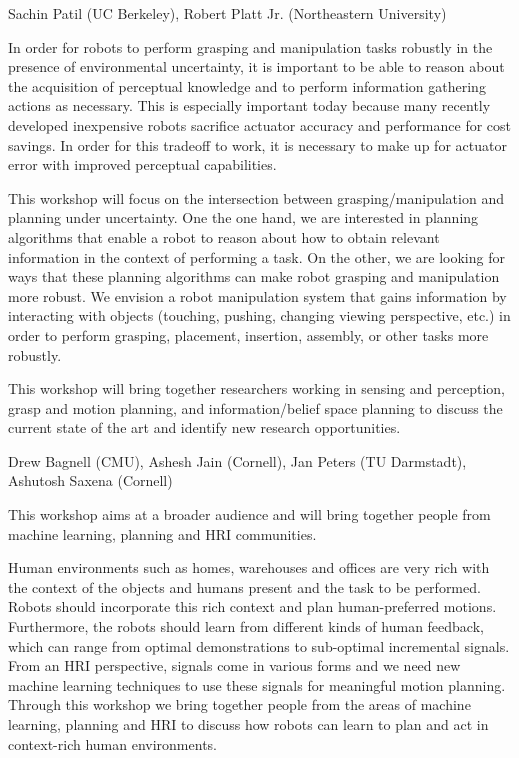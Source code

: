 \begin{spacing}{1.0}
{Sachin Patil (UC Berkeley), Robert Platt Jr. (Northeastern University)}
{
In order for robots to perform grasping and manipulation tasks robustly in the presence of environmental uncertainty, it is important to be able to reason about the acquisition of perceptual knowledge and to perform information gathering actions as necessary. This is especially important today because many recently developed inexpensive robots sacrifice actuator accuracy and performance for cost savings. In order for this tradeoff to work, it is necessary to make up for actuator error with improved perceptual capabilities.

This workshop will focus on the intersection between grasping/manipulation and planning under uncertainty. One the one hand, we are interested in planning algorithms that enable a robot to reason about how to obtain relevant information in the context of performing a task. On the other, we are looking for ways that these planning algorithms can make robot grasping and manipulation more robust. We envision a robot manipulation system that gains information by interacting with objects (touching, pushing, changing viewing perspective, etc.) in order to perform grasping, placement, insertion, assembly, or other tasks more robustly.

This workshop will bring together researchers working in sensing and perception, grasp and motion planning, and information/belief space planning to discuss the current state of the art and identify new research opportunities.
}


{Drew Bagnell (CMU), Ashesh Jain (Cornell), Jan Peters (TU Darmstadt), Ashutosh Saxena (Cornell)}
{
This workshop aims at a broader audience and will bring together people from machine learning, planning and HRI communities.

Human environments such as homes, warehouses and offices are very rich with the context of the objects and humans present and the task to be performed. Robots should incorporate this rich context and plan human-preferred motions. Furthermore, the robots should learn from different kinds of human feedback, which can range from optimal demonstrations to sub-optimal incremental signals. From an HRI perspective, signals come in various forms and we need new machine learning techniques to use these signals for meaningful motion planning. Through this workshop we bring together people from the areas of machine learning, planning and HRI to discuss how robots can learn to plan and act in context-rich human environments.
}



\end{spacing}
